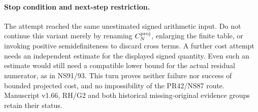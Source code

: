 \paragraph{Stop condition and next-step restriction.}
The attempt reached the same unestimated signed arithmetic input.
Do not continue this variant merely by renaming $C_N^{\rm proj}$,
enlarging the finite table, or invoking positive semidefiniteness to
discard cross terms. A further cost attempt needs an independent estimate
for the displayed signed quantity. Even such an estimate would still
need a compatible lower bound for the actual residual numerator, as in
NS91/93. This turn proves neither failure nor success of bounded projected
cost, and no impossibility of the PR42/NS87 route. Manuscript v1.66, RH/G2
and both historical missing-original evidence groups retain their status.
